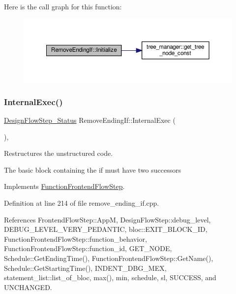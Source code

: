 Here is the call graph for this function\+:
\nopagebreak
\begin{figure}[H]
\begin{center}
\leavevmode
\includegraphics[width=350pt]{d3/d05/classRemoveEndingIf_a31a37f3146c2637dfe6ea70d51269574_cgraph}
\end{center}
\end{figure}
\mbox{\label{classRemoveEndingIf_a22b33df1189bae1af234c829c44b15b2}} 
\subsubsection{\texorpdfstring{Internal\+Exec()}{InternalExec()}}
{\footnotesize\ttfamily \hyperlink{design__flow__step_8hpp_afb1f0d73069c26076b8d31dbc8ebecdf}{Design\+Flow\+Step\+\_\+\+Status} Remove\+Ending\+If\+::\+Internal\+Exec (\begin{DoxyParamCaption}{ }\end{DoxyParamCaption})\hspace{0.3cm}{\ttfamily [override]}, {\ttfamily [virtual]}}



Restructures the unstructured code. 

The basic block containing the if must have two successors 

Implements \hyperlink{classFunctionFrontendFlowStep_a00612f7fb9eabbbc8ee7e39d34e5ac68}{Function\+Frontend\+Flow\+Step}.



Definition at line 214 of file remove\+\_\+ending\+\_\+if.\+cpp.



References Frontend\+Flow\+Step\+::\+AppM, Design\+Flow\+Step\+::debug\+\_\+level, D\+E\+B\+U\+G\+\_\+\+L\+E\+V\+E\+L\+\_\+\+V\+E\+R\+Y\+\_\+\+P\+E\+D\+A\+N\+T\+IC, bloc\+::\+E\+X\+I\+T\+\_\+\+B\+L\+O\+C\+K\+\_\+\+ID, Function\+Frontend\+Flow\+Step\+::function\+\_\+behavior, Function\+Frontend\+Flow\+Step\+::function\+\_\+id, G\+E\+T\+\_\+\+N\+O\+DE, Schedule\+::\+Get\+Ending\+Time(), Function\+Frontend\+Flow\+Step\+::\+Get\+Name(), Schedule\+::\+Get\+Starting\+Time(), I\+N\+D\+E\+N\+T\+\_\+\+D\+B\+G\+\_\+\+M\+EX, statement\+\_\+list\+::list\+\_\+of\+\_\+bloc, max(), min, schedule, sl, S\+U\+C\+C\+E\+SS, and U\+N\+C\+H\+A\+N\+G\+ED.

